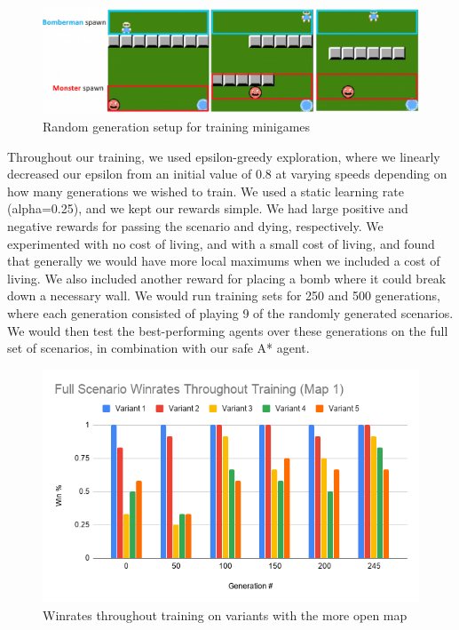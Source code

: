 \documentclass{article}
\begin{document}
\begin{figure}[h]
    \begin{minipage}{\textwidth}
      \centering
      \includegraphics[width=0.85\linewidth]{Writeup/training_setup.jpg}
      \caption*{Random generation setup for training minigames}
    \end{minipage}
\end{figure}
\clearpage
\noindent Throughout our training, we used epsilon-greedy exploration, where we linearly decreased our epsilon from an initial value of 0.8 at varying speeds depending on how many generations we wished to train. We used a static learning rate (alpha=0.25), and we kept our rewards simple. We had large positive and negative rewards for passing the scenario and dying, respectively. We experimented with no cost of living, and with a small cost of living, and found that generally we would have more local maximums when we included a cost of living. We also included another reward for placing a bomb where it could break down a necessary wall.
We would run training sets for 250 and 500 generations, where each generation consisted of playing 9 of the randomly generated scenarios. We would then test the best-performing agents over these generations on the full set of scenarios, in combination with our safe A* agent.

\begin{figure}[h]
    \begin{minipage}{\textwidth}
      \centering
      \includegraphics[width=0.65\linewidth]{Writeup/full_wr_training_map1.png}
      \caption*{Winrates throughout training on variants with the more open map}
    \end{minipage}
\end{figure}
\end{document}
